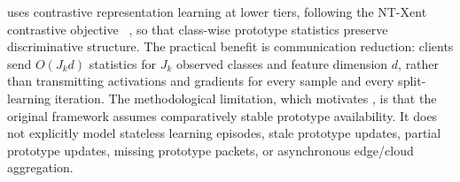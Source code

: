 \hsfp uses contrastive representation learning at lower tiers, following the NT-Xent contrastive objective ~\cite{chen2020simple}, so that class-wise prototype statistics preserve discriminative structure. The practical benefit is communication reduction: clients send $O(J_k d)$ statistics for $J_k$ observed classes and feature dimension $d$, rather than transmitting activations and gradients for every sample and every split-learning iteration. The methodological limitation, which motivates \ehsfp, is that the original framework assumes comparatively stable prototype availability. It does not explicitly model stateless learning episodes, stale prototype updates, partial prototype updates, missing prototype packets, or asynchronous edge/cloud aggregation.
